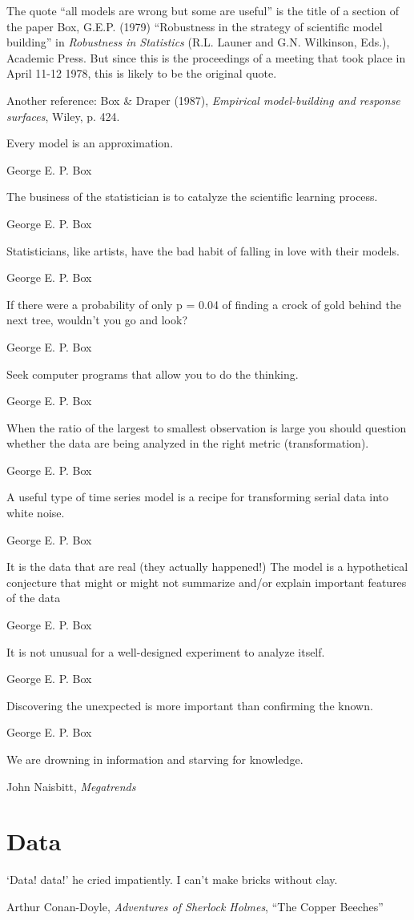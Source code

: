 The quote ``all models are wrong but some are useful'' is the title of a section of the paper Box, G.E.P. (1979) ``Robustness in the strategy of scientific model building'' in \emph{Robustness in Statistics} (R.L. Launer and G.N. Wilkinson, Eds.), Academic Press. But since this is the proceedings of a meeting that took place in April 11-12 1978, this is likely to be the original quote.

Another reference: Box \& Draper (1987), \emph{Empirical model-building and response surfaces}, Wiley, p. 424.

\epigraph{Every model is an approximation.}{George E. P. Box}



\epigraph{The business of the statistician is to catalyze the scientific learning process.}{George E. P. Box}

\epigraph{Statisticians, like artists, have the bad habit of falling in love with their models.}{George E. P. Box}

\epigraph{If there were a probability of only p = 0.04 of finding a crock of gold behind the next tree, wouldn't you go and look?}{George E. P. Box}

\epigraph{Seek computer programs that allow you to do the thinking.}{George E. P. Box}

\epigraph{When the ratio of the largest to smallest observation is large you should question whether the data are being analyzed in the right metric (transformation).}{George E. P. Box}

\epigraph{A useful type of time series model is a recipe for transforming serial data into white noise.}{George E. P. Box}


\epigraph{It is the data that are real (they actually happened!) The model is a hypothetical conjecture that might or might not summarize and/or explain important features of the data}{George E. P. Box}

\epigraph{It is not unusual for a well-designed experiment to analyze itself.}{George E. P. Box}

\epigraph{Discovering the unexpected is more important than confirming the known.}{George E. P. Box}

\epigraph{We are drowning in information and starving for knowledge.}{John Naisbitt, \emph{Megatrends}}


\section{Data}
\epigraph{`Data! data!' he cried impatiently.  I can't make bricks without clay.}{Arthur Conan-Doyle, \emph{Adventures of Sherlock Holmes}, ``The Copper Beeches''}

